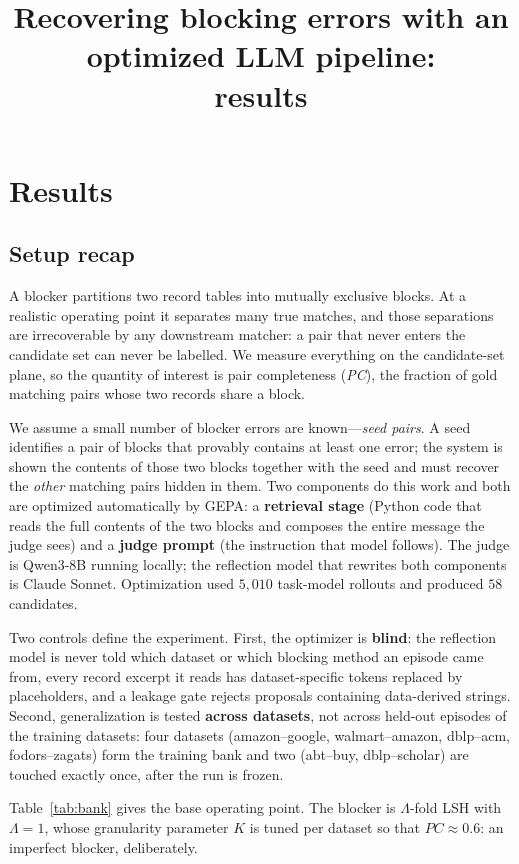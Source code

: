\documentclass[11pt]{article}
\title{Recovering blocking errors with an optimized LLM pipeline:\\results}
\date{}
\newcommand{\PC}{\textit{PC}}
\begin{document}
\maketitle

\section{Results}

\subsection{Setup recap}

A blocker partitions two record tables into mutually exclusive blocks. At a
realistic operating point it separates many true matches, and those separations
are irrecoverable by any downstream matcher: a pair that never enters the
candidate set can never be labelled. We measure everything on the candidate-set
plane, so the quantity of interest is pair completeness (\PC), the fraction of
gold matching pairs whose two records share a block.

We assume a small number of blocker errors are known---\emph{seed pairs}. A
seed identifies a pair of blocks that provably contains at least one error;
the system is shown the contents of those two blocks together with the seed and
must recover the \emph{other} matching pairs hidden in them. Two components do
this work and both are optimized automatically by GEPA: a \textbf{retrieval
stage} (Python code that reads the full contents of the two blocks and composes
the entire message the judge sees) and a \textbf{judge prompt} (the instruction
that model follows). The judge is Qwen3-8B running locally; the reflection model
that rewrites both components is Claude Sonnet. Optimization used $5{,}010$
task-model rollouts and produced $58$ candidates.

Two controls define the experiment. First, the optimizer is \textbf{blind}: the
reflection model is never told which dataset or which blocking method an episode
came from, every record excerpt it reads has dataset-specific tokens replaced by
placeholders, and a leakage gate rejects proposals containing data-derived
strings. Second, generalization is tested \textbf{across datasets}, not across
held-out episodes of the training datasets: four datasets (amazon--google,
walmart--amazon, dblp--acm, fodors--zagats) form the training bank and two
(abt--buy, dblp--scholar) are touched exactly once, after the run is frozen.

Table~\ref{tab:bank} gives the base operating point. The blocker is
$\Lambda$-fold LSH with $\Lambda=1$, whose granularity parameter $K$ is tuned
per dataset so that $\PC\approx0.6$: an imperfect blocker, deliberately.
\end{document}
